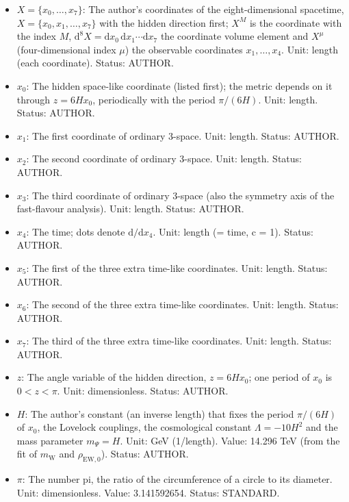 \documentclass[
  10pt,
]{article}
\providecommand{\tightlist}{%
  \setlength{\itemsep}{0pt}\setlength{\parskip}{0pt}}
\begin{document}
\begin{itemize}
\tightlist
\item
  \(X = \{x_0, \dots, x_7\}\): The author's coordinates of the
  eight-dimensional spacetime, \(X = \{x_0, x_1, \dots, x_7\}\) with the
  hidden direction first; \(X^M\) is the coordinate with the index
  \(M\),
  \(\mathrm{d}^8X = \mathrm{d}x_0\,\mathrm{d}x_1\cdots\mathrm{d}x_7\)
  the coordinate volume element and \(X^\mu\) (four-dimensional index
  \(\mu\)) the observable coordinates \(x_1, \dots, x_4\). Unit: length
  (each coordinate). Status: AUTHOR.
\item
  \(x_0\): The hidden space-like coordinate (listed first); the metric
  depends on it through \(z = 6Hx_0\), periodically with the period
  \(\pi/(6H)\). Unit: length. Status: AUTHOR.
\item
  \(x_1\): The first coordinate of ordinary 3-space. Unit: length.
  Status: AUTHOR.
\item
  \(x_2\): The second coordinate of ordinary 3-space. Unit: length.
  Status: AUTHOR.
\item
  \(x_3\): The third coordinate of ordinary 3-space (also the symmetry
  axis of the fast-flavour analysis). Unit: length. Status: AUTHOR.
\item
  \(x_4\): The time; dots denote \(\mathrm{d}/\mathrm{d}x_4\). Unit:
  length (= time, c = 1). Status: AUTHOR.
\item
  \(x_5\): The first of the three extra time-like coordinates. Unit:
  length. Status: AUTHOR.
\item
  \(x_6\): The second of the three extra time-like coordinates. Unit:
  length. Status: AUTHOR.
\item
  \(x_7\): The third of the three extra time-like coordinates. Unit:
  length. Status: AUTHOR.
\item
  \(z\): The angle variable of the hidden direction, \(z = 6Hx_0\); one
  period of \(x_0\) is \(0 < z < \pi\). Unit: dimensionless. Status:
  AUTHOR.
\item
  \(H\): The author's constant (an inverse length) that fixes the period
  \(\pi/(6H)\) of \(x_0\), the Lovelock couplings, the cosmological
  constant \(\Lambda = -10H^2\) and the mass parameter \(m_\Psi = H\).
  Unit: GeV (1/length). Value: 14.296 TeV (from the fit of
  \(m_{\mathrm{W}}\) and \(\rho_{\mathrm{EW},0}\)). Status: AUTHOR.
\item
  \(\pi\): The number pi, the ratio of the circumference of a circle to
  its diameter. Unit: dimensionless. Value: 3.141592654. Status:
  STANDARD.
\end{itemize}
\end{document}
